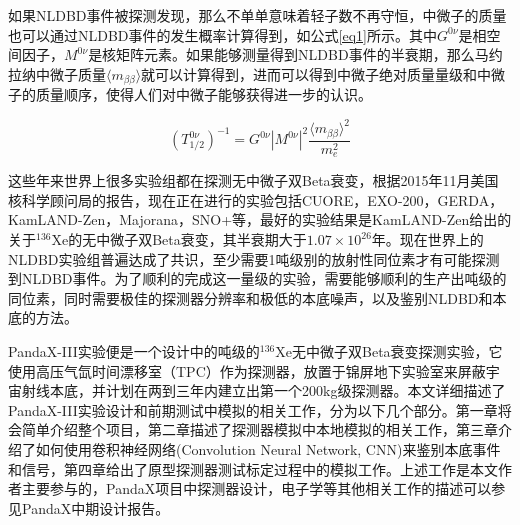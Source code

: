 如果NLDBD事件被探测发现，那么不单单意味着轻子数不再守恒，中微子的质量也可以通过NLDBD事件的发生概率计算得到，如公式\ref{eq1}所示\supercite{avignone2008double}。其中$G^{0\nu}$是相空间因子，$M^{0\nu}$是核矩阵元素。如果能够测量得到NLDBD事件的半衰期，那么马约拉纳中微子质量$\langle m_{\beta\beta}\rangle$就可以计算得到，进而可以得到中微子绝对质量量级和中微子的质量顺序，使得人们对中微子能够获得进一步的认识。

\begin{equation}
    (T_{1/2}^{0\nu})^{-1}=G^{0\nu}|M^{0\nu}|^2\frac{\langle m_{\beta\beta}\rangle ^2}{m_e^2}
    \label{eq1}
\end{equation}

这些年来世界上很多实验组都在探测无中微子双Beta衰变，根据2015年11月美国核科学顾问局的报告\supercite{NLDBD_NSAC}，现在正在进行的实验包括CUORE\supercite{Artusa:2014lgv}，EXO-200\supercite{Albert:2014awa}，GERDA\supercite{Agostini:2016iid}，KamLAND-Zen\supercite{KamLAND-Zen:2016pfg}，Majorana\supercite{Abgrall:2013rze}，SNO+\supercite{Andringa:2015tza}等，最好的实验结果是KamLAND-Zen给出的关于$^{136}$Xe的无中微子双Beta衰变，其半衰期大于$1.07\times10^26$年。现在世界上的NLDBD实验组普遍达成了共识，至少需要1吨级别的放射性同位素才有可能探测到NLDBD事件。为了顺利的完成这一量级的实验，需要能够顺利的生产出吨级的同位素，同时需要极佳的探测器分辨率和极低的本底噪声，以及鉴别NLDBD和本底的方法。

PandaX-III实验便是一个设计中的吨级的$^{136}$Xe无中微子双Beta衰变探测实验，它使用高压气氙时间漂移室（TPC）作为探测器，放置于锦屏地下实验室来屏蔽宇宙射线本底，并计划在两到三年内建立出第一个200kg级探测器。本文详细描述了PandaX-III实验设计和前期测试中模拟的相关工作，分为以下几个部分。第一章将会简单介绍整个项目，第二章描述了探测器模拟中本地模拟的相关工作，第三章介绍了如何使用卷积神经网络(Convolution Neural Network, CNN)来鉴别本底事件和信号，第四章给出了原型探测器测试标定过程中的模拟工作。上述工作是本文作者主要参与的，PandaX项目中探测器设计，电子学等其他相关工作的描述可以参见PandaX中期设计报告\supercite{chen2017pandax}。


